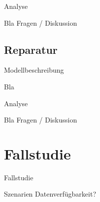 \documentclass[beamer]{beamer}
\begin{document}
	\begin{frame}{Analyse}
		\begin{center}
			Bla
			Fragen / Diskussion
		\end{center}
	\end{frame}
	
\subsection{Reparatur}
\frame{\subsectionpage}
	\begin{frame}{Modellbeschreibung}
		\begin{center}
			Bla
		\end{center}
	\end{frame}
	
	\begin{frame}{Analyse}
		\begin{center}
			Bla
			Fragen / Diskussion
		\end{center}
	\end{frame}

\section{Fallstudie}
	\begin{frame}{Fallstudie}
		\begin{center}
			Szenarien
			Datenverfügbarkeit?
		\end{center}
	\end{frame}
\end{document}

